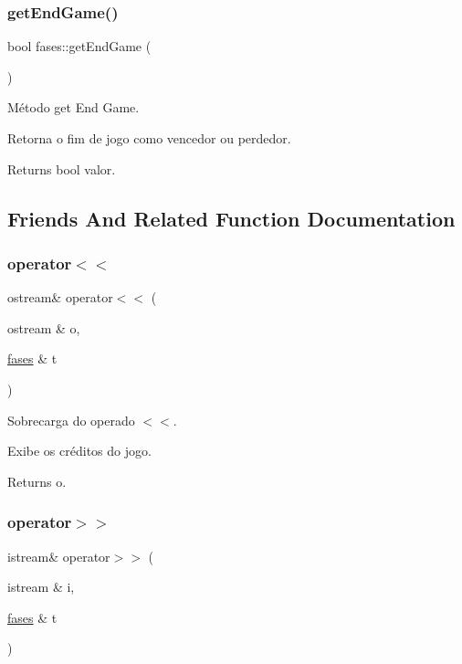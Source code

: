 \subsubsection{\texorpdfstring{get\+End\+Game()}{getEndGame()}}
{\footnotesize\ttfamily bool fases\+::get\+End\+Game (\begin{DoxyParamCaption}{ }\end{DoxyParamCaption})}



Método get End Game. 

Retorna o fim de jogo como vencedor ou perdedor. \begin{DoxyReturn}{Returns}
bool valor. 
\end{DoxyReturn}


\subsection{Friends And Related Function Documentation}
\mbox{\label{classfases_a918b9b50f8716407ea46bdfbf5848271}} 
\subsubsection{\texorpdfstring{operator$<$$<$}{operator<<}}
{\footnotesize\ttfamily ostream\& operator$<$$<$ (\begin{DoxyParamCaption}\item[{ostream \&}]{o,  }\item[{\mbox{\hyperlink{classfases}{fases}} \&}]{t }\end{DoxyParamCaption})\hspace{0.3cm}{\ttfamily [friend]}}



Sobrecarga do operado $<$$<$. 

Exibe os créditos do jogo. \begin{DoxyReturn}{Returns}
o. 
\end{DoxyReturn}
\mbox{\label{classfases_a24bc7622c7828e59917da245c41920d8}} 
\subsubsection{\texorpdfstring{operator$>$$>$}{operator>>}}
{\footnotesize\ttfamily istream\& operator$>$$>$ (\begin{DoxyParamCaption}\item[{istream \&}]{i,  }\item[{\mbox{\hyperlink{classfases}{fases}} \&}]{t }\end{DoxyParamCaption})\hspace{0.3cm}{\ttfamily [friend]}}



